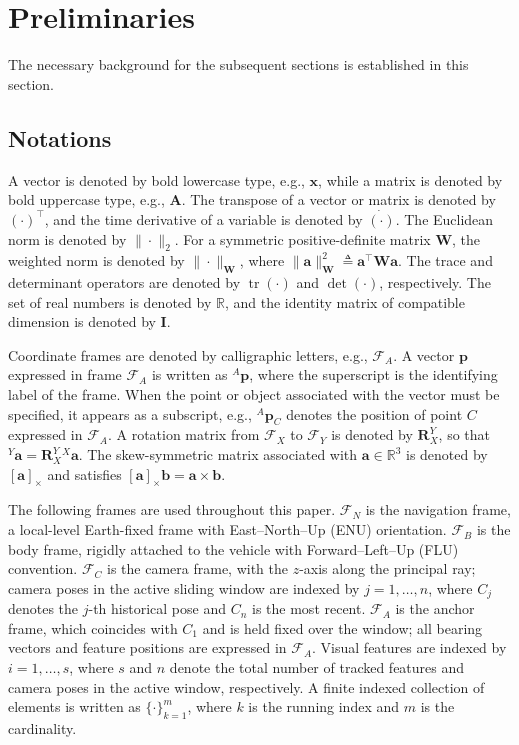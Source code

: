 \documentclass[journal]{IEEEtran}
\newcommand{\sx}[1]{[#1]_{\times}}
\newcommand{\Tr}{\operatorname{tr}}
\begin{document}
\section{Preliminaries}
\label{preliminaries}

The necessary background for the subsequent sections is established in this section.

\subsection{Notations}
\label{notations}

A vector is denoted by bold lowercase type, e.g., $\bm{x}$, while a matrix is denoted by bold uppercase type, e.g., $\bm{A}$. The transpose of a vector or matrix is denoted by $(\cdot)^{\top}$, and the time derivative of a variable is denoted by $\dot{(\cdot)}$. The Euclidean norm is denoted by $\|\cdot\|_{2}$. For a symmetric positive-definite matrix $\bm{W}$, the weighted norm is denoted by $\|\cdot\|_{\bm{W}}$, where $\|\bm{a}\|_{\bm{W}}^{2} \triangleq \bm{a}^{\top}\bm{W}\bm{a}$. The trace and determinant operators are denoted by $\Tr(\cdot)$ and $\det(\cdot)$, respectively. The set of real numbers is denoted by $\mathbb{R}$, and the identity matrix of compatible dimension is denoted by $\bm{I}$.

Coordinate frames are denoted by calligraphic letters, e.g., $\mathcal{F}_{A}$. A vector $\bm{p}$ expressed in frame $\mathcal{F}_{A}$ is written as ${}^{A}\bm{p}$, where the superscript is the identifying label of the frame. When the point or object associated with the vector must be specified, it appears as a subscript, e.g., ${}^{A}\bm{p}_{C}$ denotes the position of point $C$ expressed in $\mathcal{F}_{A}$. A rotation matrix from $\mathcal{F}_{X}$ to $\mathcal{F}_{Y}$ is denoted by $\bm{R}_{X}^{Y}$, so that ${}^{Y}\bm{a}=\bm{R}_{X}^{Y}{}^{X}\bm{a}$. The skew-symmetric matrix associated with $\bm{a}\in\mathbb{R}^{3}$ is denoted by $\sx{\bm{a}}$ and satisfies $\sx{\bm{a}}\bm{b}=\bm{a}\times\bm{b}$. 

The following frames are used throughout this paper. $\mathcal{F}_{N}$ is the navigation frame, a local-level Earth-fixed frame with East--North--Up (ENU) orientation. $\mathcal{F}_{B}$ is the body frame, rigidly attached to the vehicle with Forward--Left--Up (FLU) convention. $\mathcal{F}_{C}$ is the camera frame, with the $z$-axis along the principal ray; camera poses in the active sliding window are indexed by $j=1,\ldots,n$, where $C_j$ denotes the $j$-th historical pose and $C_n$ is the most recent. $\mathcal{F}_{A}$ is the anchor frame, which coincides with $C_1$ and is held fixed over the window; all bearing vectors and feature positions are expressed in $\mathcal{F}_{A}$. Visual features are indexed by $i=1,\ldots,s$, where $s$ and $n$ denote the total number of tracked features and camera poses in the active window, respectively. A finite indexed collection of elements is written as $\{\cdot\}_{k=1}^{m}$, where $k$ is the running index and $m$ is the cardinality.
\end{document}
